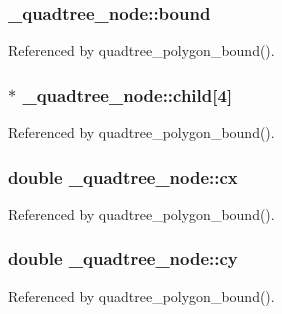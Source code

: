 \subsubsection[{\texorpdfstring{bound}{bound}}]{ \+\_\+quadtree\+\_\+node\+::bound}\hypertarget{struct__quadtree__node_ae7ad530aa3d2191e2039867a9699bdd9}{}\label{struct__quadtree__node_ae7ad530aa3d2191e2039867a9699bdd9}


Referenced by quadtree\+\_\+polygon\+\_\+bound().

\subsubsection[{\texorpdfstring{child}{child}}]{$\ast$ \+\_\+quadtree\+\_\+node\+::child\mbox{[}4\mbox{]}}\hypertarget{struct__quadtree__node_ac18415fd1443c1a44323ce4867b717b7}{}\label{struct__quadtree__node_ac18415fd1443c1a44323ce4867b717b7}


Referenced by quadtree\+\_\+polygon\+\_\+bound().

\subsubsection[{\texorpdfstring{cx}{cx}}]{\setlength{\rightskip}{0pt plus 5cm}double \+\_\+quadtree\+\_\+node\+::cx}\hypertarget{struct__quadtree__node_a38a4256186a36066306a04b1c2be35fb}{}\label{struct__quadtree__node_a38a4256186a36066306a04b1c2be35fb}


Referenced by quadtree\+\_\+polygon\+\_\+bound().

\subsubsection[{\texorpdfstring{cy}{cy}}]{\setlength{\rightskip}{0pt plus 5cm}double \+\_\+quadtree\+\_\+node\+::cy}\hypertarget{struct__quadtree__node_a35d069b1ce9dbfb2f5e076f73650b12c}{}\label{struct__quadtree__node_a35d069b1ce9dbfb2f5e076f73650b12c}


Referenced by quadtree\+\_\+polygon\+\_\+bound().

